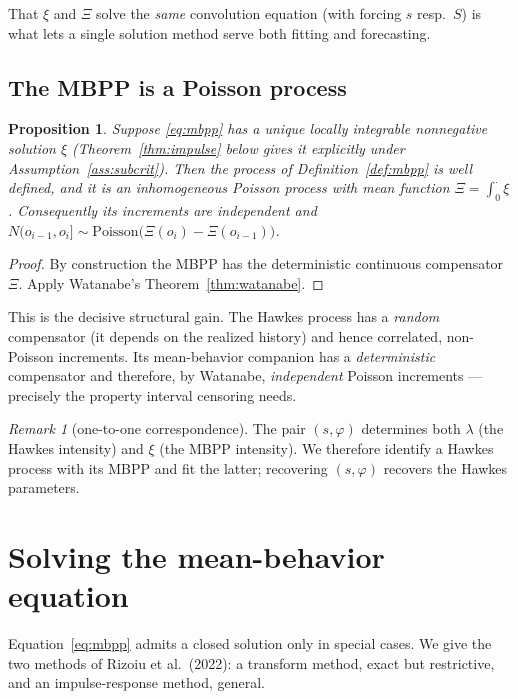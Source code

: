 \documentclass[11pt]{article}
\theoremstyle{plain}
\newtheorem{proposition}[theorem]{Proposition}
\theoremstyle{definition}
\theoremstyle{remark}
\newtheorem*{remark}{Remark}
\begin{document}
That $\xi$ and $\Xi$ solve the \emph{same} convolution equation (with forcing $s$
resp.\ $S$) is what lets a single solution method serve both fitting and
forecasting.

\subsection{The MBPP is a Poisson process}

\begin{proposition}
\label{prop:poisson}
Suppose \eqref{eq:mbpp} has a unique locally integrable nonnegative solution
$\xi$ (Theorem~\ref{thm:impulse} below gives it explicitly under
Assumption~\ref{ass:subcrit}). Then the process of Definition~\ref{def:mbpp} is
well defined, and it is an inhomogeneous Poisson process with mean function
$\Xi=\int_0^\cdot\xi$. Consequently its increments are independent and
$N(o_{i-1},o_i]\sim\mathrm{Poisson}\big(\Xi(o_i)-\Xi(o_{i-1})\big)$.
\end{proposition}
\begin{proof}
By construction the MBPP has the deterministic continuous compensator $\Xi$.
Apply Watanabe's Theorem~\ref{thm:watanabe}.
\end{proof}

This is the decisive structural gain. The Hawkes process has a \emph{random}
compensator (it depends on the realized history) and hence correlated, non-Poisson
increments. Its mean-behavior companion has a \emph{deterministic} compensator and
therefore, by Watanabe, \emph{independent} Poisson increments --- precisely the
property interval censoring needs.

\begin{remark}[one-to-one correspondence]
The pair $(s,\varphi)$ determines both $\lambda$ (the Hawkes intensity) and $\xi$
(the MBPP intensity). We therefore identify a Hawkes process with its MBPP and
fit the latter; recovering $(s,\varphi)$ recovers the Hawkes parameters.
\end{remark}

\section{Solving the mean-behavior equation}
\label{sec:solve}

Equation~\eqref{eq:mbpp} admits a closed solution only in special cases. We give
the two methods of Rizoiu et al.\ (2022): a transform method, exact but
restrictive, and an impulse-response method, general.
\end{document}
